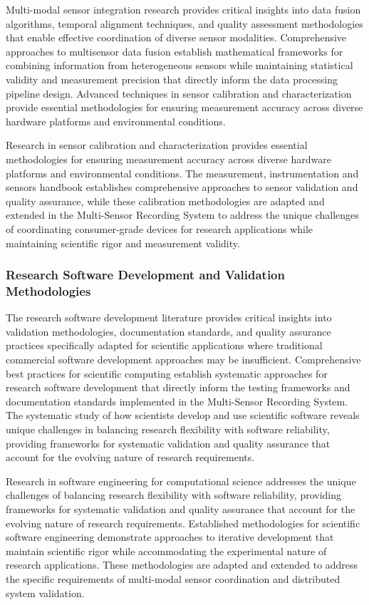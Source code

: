 \documentclass[11pt,a4paper]{article}
\begin{document}
Multi-modal sensor integration research provides critical insights into data fusion algorithms, temporal alignment
techniques, and quality assessment methodologies that enable effective coordination of diverse sensor modalities.
Comprehensive approaches to multisensor data fusion establish mathematical frameworks for combining information from
heterogeneous sensors while maintaining statistical validity and measurement precision that directly inform the data
processing pipeline design. Advanced techniques in sensor calibration and characterization provide essential
methodologies for ensuring measurement accuracy across diverse hardware platforms and environmental conditions.

Research in sensor calibration and characterization provides essential methodologies for ensuring measurement accuracy
across diverse hardware platforms and environmental conditions. The measurement, instrumentation and sensors handbook
establishes comprehensive approaches to sensor validation and quality assurance, while these calibration methodologies
are adapted and extended in the Multi-Sensor Recording System to address the unique challenges of coordinating
consumer-grade devices for research applications while maintaining scientific rigor and measurement validity.

\subsubsection{Research Software Development and Validation Methodologies}

The research software development literature provides critical insights into validation methodologies, documentation
standards, and quality assurance practices specifically adapted for scientific applications where traditional commercial
software development approaches may be insufficient. Comprehensive best practices for scientific computing establish
systematic approaches for research software development that directly inform the testing frameworks and documentation
standards implemented in the Multi-Sensor Recording System. The systematic study of how scientists develop and use
scientific software reveals unique challenges in balancing research flexibility with software reliability, providing
frameworks for systematic validation and quality assurance that account for the evolving nature of research
requirements.

Research in software engineering for computational science addresses the unique challenges of balancing research
flexibility with software reliability, providing frameworks for systematic validation and quality assurance that account
for the evolving nature of research requirements. Established methodologies for scientific software engineering
demonstrate approaches to iterative development that maintain scientific rigor while accommodating the experimental
nature of research applications. These methodologies are adapted and extended to address the specific requirements of
multi-modal sensor coordination and distributed system validation.
\end{document}
